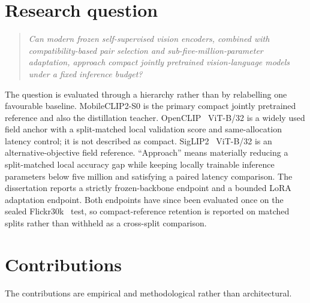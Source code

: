 \section{Research question}
\begin{quote}
\itshape
Can modern frozen self-supervised vision encoders, combined with compatibility-based pair selection and sub-five-million-parameter adaptation, approach compact jointly pretrained vision-language models under a fixed inference budget?
\end{quote}
The question is evaluated through a hierarchy rather than by relabelling one favourable baseline. MobileCLIP2-S0 is the primary compact jointly pretrained reference and also the distillation teacher. OpenCLIP~\cite{cherti2023scaling} ViT-B/32 is a widely used field anchor with a split-matched local validation score and same-allocation latency control; it is not described as compact. SigLIP2~\cite{tschannen2025siglip2} ViT-B/32 is an alternative-objective field reference. ``Approach'' means materially reducing a split-matched local accuracy gap while keeping locally trainable inference parameters below five million and satisfying a paired latency comparison. The dissertation reports a strictly frozen-backbone endpoint and a bounded LoRA~\cite{hu2021lora} adaptation endpoint. Both endpoints have since been evaluated once on the sealed Flickr30k~\cite{young2014flickr30k} test, so compact-reference retention is reported on matched splits rather than withheld as a cross-split comparison.

\section{Contributions}
The contributions are empirical and methodological rather than architectural.

